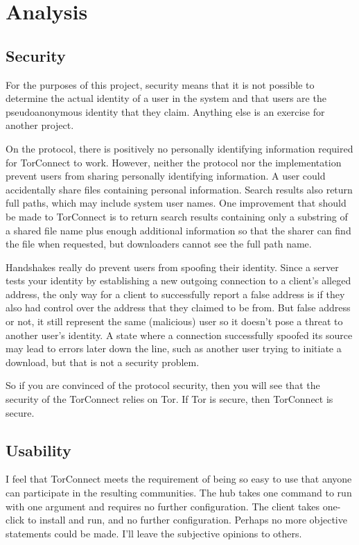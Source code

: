 \documentclass{article}
\begin{document}
\section{Analysis}
\subsection{Security}
For the purposes of this project, security means that it is not possible to determine the actual identity of a user in the system and that users are the pseudoanonymous identity that they claim.  Anything else is an exercise for another project.

On the protocol, there is positively no personally identifying information required for TorConnect to work.  However, neither the protocol nor the implementation prevent users from sharing personally identifying information.  A user could accidentally share files containing personal information.  Search results also return full paths, which may include system user names.  One improvement that should be made to TorConnect is to return search results containing only a substring of a shared file name plus enough additional information so that the sharer can find the file when requested, but downloaders cannot see the full path name.

Handshakes really do prevent users from spoofing their identity.  Since a server tests your identity by establishing a new outgoing connection to a client's alleged address, the only way for a client to successfully report a false address is if they also had control over the address that they claimed to be from.  But false address or not, it still represent the same (malicious) user so it doesn't pose a threat to another user's identity.  A state where a connection successfully spoofed its source may lead to errors later down the line, such as another user trying to initiate a download, but that is not a security problem.

So if you are convinced of the protocol security, then you will see that the security of the TorConnect relies on Tor.  If Tor is secure, then TorConnect is secure.

\subsection{Usability}
I feel that TorConnect meets the requirement of being so easy to use that anyone can participate in the resulting communities.  The hub takes one command to run with one argument and requires no further configuration.  The client takes one-click to install and run, and no further configuration.  Perhaps no more objective statements could be made.  I'll leave the subjective opinions to others.
\end{document}
